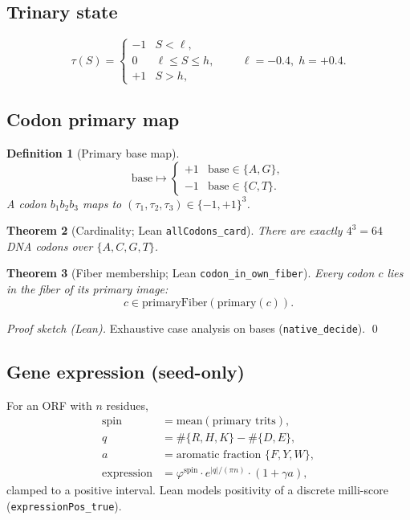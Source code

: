 \documentclass[11pt,a4paper]{article}
\newtheorem{theorem}{Theorem}
\newtheorem{definition}[theorem]{Definition}
\begin{document}
\subsection{Trinary state}
\[
\tau(S)=\begin{cases}
-1 & S<\ell,\\
0 & \ell\le S\le h,\\
+1 & S>h,
\end{cases}
\qquad \ell=-0.4,\; h=+0.4.
\]

\subsection{Codon primary map}
\label{sec:codon}

\begin{definition}[Primary base map]
\[
\mathrm{base}\mapsto\begin{cases}
+1 & \mathrm{base}\in\{A,G\},\\
-1 & \mathrm{base}\in\{C,T\}.
\end{cases}
\]
A codon \(b_1b_2b_3\) maps to \((\tau_1,\tau_2,\tau_3)\in\{-1,+1\}^3\).
\end{definition}

\begin{theorem}[Cardinality; Lean \texttt{allCodons\_card}]
There are exactly \(4^3=64\) DNA codons over \(\{A,C,G,T\}\).
\end{theorem}

\begin{theorem}[Fiber membership; Lean \texttt{codon\_in\_own\_fiber}]
Every codon \(c\) lies in the fiber of its primary image:
\[
c\in \mathrm{primaryFiber}(\mathrm{primary}(c)).
\]
\end{theorem}
\noindent\textit{Proof sketch (Lean).} Exhaustive case analysis on bases (\texttt{native\_decide}).
\qed

\subsection{Gene expression (seed-only)}
\label{sec:expression}

For an ORF with \(n\) residues,
\begin{align}
\mathrm{spin}&=\mathrm{mean}(\text{primary trits}),\\
q&=\#\{R,H,K\}-\#\{D,E\},\\
a&=\text{aromatic fraction }\{F,Y,W\},\\
\mathrm{expression}&=\varphi^{\mathrm{spin}}\cdot e^{|q|/(\pi n)}\cdot(1+\gamma a),
\end{align}
clamped to a positive interval. Lean models positivity of a discrete milli-score
(\texttt{expressionPos\_true}).
\end{document}
